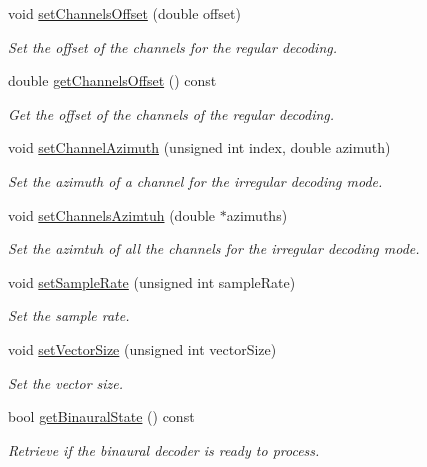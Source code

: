\begin{DoxyCompactItemize}
void \hyperlink{class_hoa2_d_1_1_decoder_multi_a2cbf708c33f7bcb39895b058c1e139c1}{set\-Channels\-Offset} (double offset)
\begin{DoxyCompactList}\small\item\em Set the offset of the channels for the regular decoding. \end{DoxyCompactList}\item 
double \hyperlink{class_hoa2_d_1_1_decoder_multi_af31ea39af39be29e71f3b075470f16ad}{get\-Channels\-Offset} () const 
\begin{DoxyCompactList}\small\item\em Get the offset of the channels of the regular decoding. \end{DoxyCompactList}\item 
void \hyperlink{class_hoa2_d_1_1_decoder_multi_a3f8a24171531b8a83a21199d0c21608b}{set\-Channel\-Azimuth} (unsigned int index, double azimuth)
\begin{DoxyCompactList}\small\item\em Set the azimuth of a channel for the irregular decoding mode. \end{DoxyCompactList}\item 
void \hyperlink{class_hoa2_d_1_1_decoder_multi_ae87c004b9f042b301532e90a64f92414}{set\-Channels\-Azimtuh} (double $\ast$azimuths)
\begin{DoxyCompactList}\small\item\em Set the azimtuh of all the channels for the irregular decoding mode. \end{DoxyCompactList}\item 
void \hyperlink{class_hoa2_d_1_1_decoder_multi_aa15da12ba3889edc22ec9c148dd5c692}{set\-Sample\-Rate} (unsigned int sample\-Rate)
\begin{DoxyCompactList}\small\item\em Set the sample rate. \end{DoxyCompactList}\item 
void \hyperlink{class_hoa2_d_1_1_decoder_multi_a875eb671767c2f547453e6d7a1401f15}{set\-Vector\-Size} (unsigned int vector\-Size)
\begin{DoxyCompactList}\small\item\em Set the vector size. \end{DoxyCompactList}\item 
bool \hyperlink{class_hoa2_d_1_1_decoder_multi_a67e02e68e5ddaa18aa46e874ab5b6ad0}{get\-Binaural\-State} () const 
\begin{DoxyCompactList}\small\item\em Retrieve if the binaural decoder is ready to process. \end{DoxyCompactList}\item 

\end{DoxyCompactItemize}
